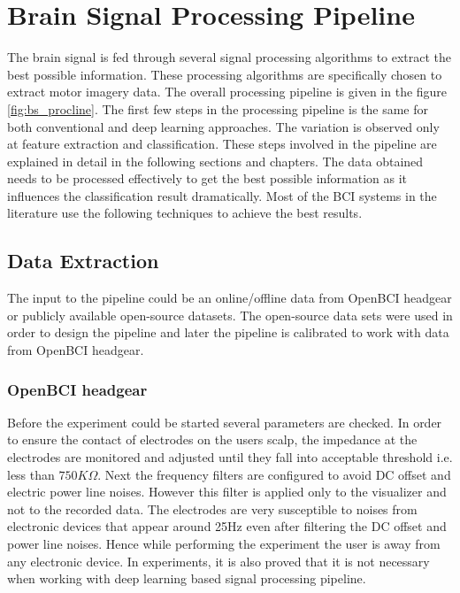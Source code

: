 \section{Brain Signal Processing Pipeline}
The brain signal is fed through several signal processing algorithms to extract the best possible information. These processing algorithms are specifically chosen to extract motor imagery data. The overall processing pipeline is given in the figure \ref{fig:bs_procline}. The first few steps in the processing pipeline is the same for both conventional and deep learning approaches.  The variation is observed only at feature extraction and classification. These steps involved in the pipeline are explained in detail in the following sections and chapters. The data obtained needs to be processed effectively to get the best possible information as it influences the classification result dramatically. Most of the BCI systems in the literature use the following techniques to achieve the best results. 

\subsection{Data Extraction}
The input to the pipeline could be an online/offline data from OpenBCI headgear or publicly available open-source datasets. The open-source data sets were used in order to design the pipeline and later the pipeline is calibrated to work with data from OpenBCI headgear.

\subsubsection{OpenBCI headgear}
Before the experiment could be started several parameters are checked. In order to ensure the contact of electrodes on the users scalp, the impedance at the electrodes are monitored and adjusted until they fall into acceptable threshold i.e. less than $750K\Omega$. Next the frequency filters are configured to avoid DC offset and electric power line noises. However this filter is applied only to the visualizer and not to the recorded data. The electrodes are very susceptible to noises from electronic devices that appear around 25Hz even after filtering the DC offset and power line noises. Hence while performing the experiment the user is away from any electronic device. In experiments, it is also proved that it is not necessary when working with deep learning based signal processing pipeline.

